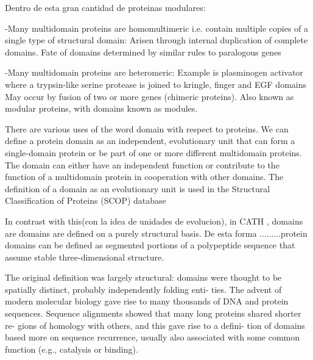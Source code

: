 Dentro de esta gran cantidad de proteinas modulares:

-Many multidomain proteins are homomultimeric i.e. contain multiple copies of a single type of structural domain: Arisen through internal duplication of complete domains. Fate of domains determined by similar rules to paralogous genes

-Many multidomain proteins are heteromeric: Example is plasminogen activator where a trypsin-like serine protease is joined to kringle, finger and EGF domains
May occur by fusion of two or more genes (chimeric proteins). Also known as modular proteins, with domains known as modules. 




There are various uses of the word domain with respect to proteins. 
We can define a protein domain as an independent, evolutionary unit that can form a single-domain protein or be part of one or more different multidomain proteins. The domain can either have an independent
function or contribute to the function of a multidomain protein in cooperation with other domains. 
The definition of a domain as an evolutionary unit is used in the Structural Classification of Proteins (SCOP) database \cite{murzin1995scop}



In contrast with this(con la idea de unidades de evolucion), in CATH \cite{orengo1997cath}, domains are domains are defined on a purely structural basis.
De esta forma .........protein domains can be defined as segmented portions of a polypeptide sequence that assume stable three-dimensional structure.

The original definition was largely structural: domains were thought
to be spatially distinct, probably independently folding enti-
ties. The advent of modern molecular biology gave rise to
many thousands of DNA and protein sequences. Sequence
alignments showed that many long proteins shared shorter re-
gions of homology with others, and this gave rise to a defini-
tion of domains based more on sequence recurrence, usually
also associated with some common function (e.g., catalysis
or binding). 





